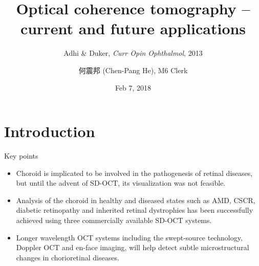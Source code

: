 \documentclass{beamer}
\title[OCT applications (Adhi \& Duker)]{Optical coherence tomography -- current and future applications}
\subtitle{Adhi \& Duker, \textit{Curr Opin Ophthalmol}, 2013}
\author[Chen-Pang He]{何震邦 (Chen-Pang He), M6 Clerk}
\date{Feb 7, 2018}
\institute[TMUH]
{
    Department of Ophthalmology\\
    Taipei Medical University Hospital
}
\begin{document}
\maketitle

\section{Introduction}
\begin{frame}{Key points}
    \begin{itemize}
        \item Choroid is implicated to be involved in the pathogenesis of
            retinal diseases, but until the advent of SD-OCT, its visualization
            was not feasible.
        \item Analysis of the choroid in healthy and diseased states such as
            AMD, CSCR, diabetic retinopathy and inherited retinal dystrophies
            has been successfully achieved using three commercially available
            SD-OCT systems.
        \item Longer wavelength OCT systems including the swept-source
            technology, Doppler OCT and en-face imaging, will help detect
            subtle microstructural changes in chorioretinal diseases.
    \end{itemize}
\end{frame}
\end{document}
